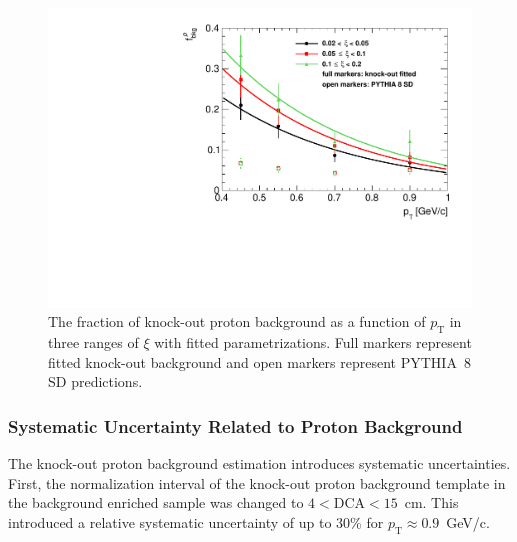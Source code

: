  \begin{figure}[h!]%
 	\centering
 	\includegraphics[width=0.8\linewidth, page=1]{chapters/chrgSTAR/img/DCAproton/bkg_p.pdf}
 	\caption{The fraction of knock-out proton background  as a function of $p_\textrm{T}$ in three ranges of $\xi$  with  fitted parametrizations. Full markers represent fitted knock-out background and open markers represent PYTHIA~8 SD predictions.}
 	\label{fig:bkg_proton_fit}
 \end{figure}

 \FloatBarrier
 \subsubsection{Systematic Uncertainty Related to Proton Background} 
The knock-out proton background estimation  introduces  systematic uncertainties. %
First, the normalization interval of the  knock-out   proton  background template in the background enriched sample was changed to $4<\textrm{DCA}<15$~cm. This introduced a relative systematic uncertainty of up to $30\%$ for $p_\textrm{T}\approx 0.9$~GeV/c. 

